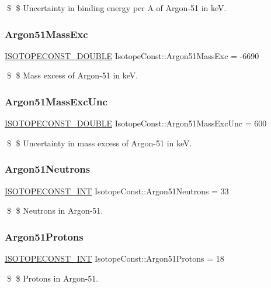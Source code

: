 \$ \$ Uncertainty in binding energy per A of Argon-\/51 in keV. \mbox{\label{group___isotope_const-_argon-_ar51_ga74108c1182d16efd63b4b4248ccbce5c}} 
\subsubsection{\texorpdfstring{Argon51\+Mass\+Exc}{Argon51MassExc}}
{\footnotesize\ttfamily \mbox{\hyperlink{group___isotope_const-_macros_ga8f45a7272ce02c0b4c65c44636ed719a}{I\+S\+O\+T\+O\+P\+E\+C\+O\+N\+S\+T\+\_\+\+D\+O\+U\+B\+LE}} Isotope\+Const\+::\+Argon51\+Mass\+Exc = -\/6690}

\$ \$ Mass excess of Argon-\/51 in keV. \mbox{\label{group___isotope_const-_argon-_ar51_ga8587a53edfd77c94f668ff7bbec40bfb}} 
\subsubsection{\texorpdfstring{Argon51\+Mass\+Exc\+Unc}{Argon51MassExcUnc}}
{\footnotesize\ttfamily \mbox{\hyperlink{group___isotope_const-_macros_ga8f45a7272ce02c0b4c65c44636ed719a}{I\+S\+O\+T\+O\+P\+E\+C\+O\+N\+S\+T\+\_\+\+D\+O\+U\+B\+LE}} Isotope\+Const\+::\+Argon51\+Mass\+Exc\+Unc = 600}

\$ \$ Uncertainty in mass excess of Argon-\/51 in keV. \mbox{\label{group___isotope_const-_argon-_ar51_ga20030ada5682057f66c5fb23695eff96}} 
\subsubsection{\texorpdfstring{Argon51\+Neutrons}{Argon51Neutrons}}
{\footnotesize\ttfamily \mbox{\hyperlink{group___isotope_const-_macros_ga5f18360b3e99483a35c32d789e62621c}{I\+S\+O\+T\+O\+P\+E\+C\+O\+N\+S\+T\+\_\+\+I\+NT}} Isotope\+Const\+::\+Argon51\+Neutrons = 33}

\$ \$ Neutrons in Argon-\/51. \mbox{\label{group___isotope_const-_argon-_ar51_gabea32fc55db0e3608104d0ea51d3c746}} 
\subsubsection{\texorpdfstring{Argon51\+Protons}{Argon51Protons}}
{\footnotesize\ttfamily \mbox{\hyperlink{group___isotope_const-_macros_ga5f18360b3e99483a35c32d789e62621c}{I\+S\+O\+T\+O\+P\+E\+C\+O\+N\+S\+T\+\_\+\+I\+NT}} Isotope\+Const\+::\+Argon51\+Protons = 18}

\$ \$ Protons in Argon-\/51. 